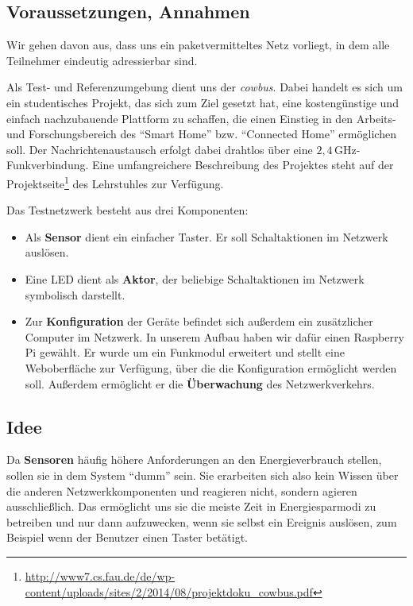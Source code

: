 \documentclass{IEEEtran}
\begin{document}
    \subsection{Voraussetzungen, Annahmen}
        Wir gehen davon aus, dass uns ein paketvermitteltes Netz vorliegt,
        in dem alle Teilnehmer eindeutig adressierbar sind.

        Als Test- und Referenzumgebung dient uns der \emph{cowbus}.
        Dabei handelt es sich um ein studentisches Projekt,
        das sich zum Ziel gesetzt hat,
        eine kostengünstige und einfach nachzubauende Plattform zu schaffen,
        die einen Einstieg in den Arbeits- und Forschungsbereich des
        \enquote{Smart Home} bzw. \enquote{Connected Home} ermöglichen soll.
        Der Nachrichtenaustausch erfolgt dabei drahtlos über eine
        $2,4$\,GHz-Funkverbindung. Eine umfangreichere Beschreibung des Projektes
        steht auf der
        Projektseite\footnote{\url{http://www7.cs.fau.de/de/wp-content/uploads/sites/2/2014/08/projektdoku_cowbus.pdf}}
        des Lehrstuhles zur Verfügung.

        Das Testnetzwerk besteht aus drei Komponenten:
        \begin{itemize}
            \item Als \textbf{Sensor} dient ein einfacher Taster.
                Er soll Schaltaktionen im Netzwerk auslösen.
            \item Eine LED dient als \textbf{Aktor},
                der beliebige Schaltaktionen im Netzwerk symbolisch darstellt.
            \item Zur \textbf{Konfiguration} der Geräte befindet sich
                außerdem ein zusätzlicher Computer im Netzwerk.
                In unserem Aufbau haben wir dafür einen Raspberry Pi gewählt.
                Er wurde um ein Funkmodul erweitert und stellt eine
                Weboberfläche zur Verfügung,
                über die die Konfiguration ermöglicht werden soll.
                Außerdem ermöglicht er die \textbf{Überwachung} des Netzwerkverkehrs.
        \end{itemize}

    \subsection{Idee}
        Da \textbf{Sensoren} häufig höhere Anforderungen an den Energieverbrauch
        stellen, sollen sie in dem System \enquote{dumm} sein.
        Sie erarbeiten sich also kein Wissen über die anderen Netzwerkkomponenten
        und reagieren nicht, sondern agieren ausschließlich.
        Das ermöglicht uns sie die meiste Zeit in Energiesparmodi zu betreiben
        und nur dann aufzuwecken, wenn sie selbst ein Ereignis auslösen,
        zum Beispiel wenn der Benutzer einen Taster betätigt.
\end{document}
